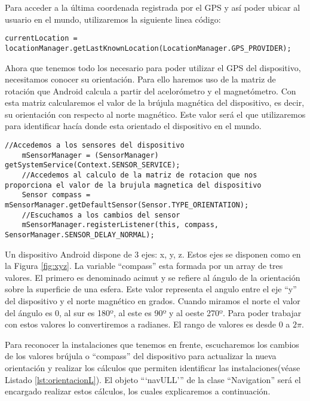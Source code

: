 Para acceder a la última coordenada registrada por el GPS y así poder ubicar al usuario en el mundo, utilizaremos la siguiente linea código:

\begin{lstlisting}[caption={Código para acceder a la última ubicación registrada del GPS.}, label={lst:ubicacionL}]
    currentLocation = locationManager.getLastKnownLocation(LocationManager.GPS_PROVIDER);
\end{lstlisting}


Ahora que tenemos todo los necesario para poder utilizar el GPS del dispositivo, necesitamos conocer su orientación. Para ello haremos uso de la matriz de rotación que Android calcula a partir del acelorómetro y el magnetómetro. Con esta matriz calcularemos el valor de la brújula magnética del dispositivo, es decir, su orientación con respecto al norte magnético. Este valor será el que utilizaremos para identificar hacía donde esta orientado el dispositivo en el mundo.


\begin{lstlisting}[caption={Código para acceder a la última ubicación registrada del GPS.}, label={lst:ubicacionL}]
    //Accedemos a los sensores del dispositivo
    mSensorManager = (SensorManager) getSystemService(Context.SENSOR_SERVICE); 
    //Accedemos al calculo de la matriz de rotacion que nos proporciona el valor de la brujula magnetica del dispositivo
    Sensor compass = mSensorManager.getDefaultSensor(Sensor.TYPE_ORIENTATION);
    //Escuchamos a los cambios del sensor
    mSensorManager.registerListener(this, compass, SensorManager.SENSOR_DELAY_NORMAL);    
\end{lstlisting}
 
Un dispositivo Android dispone de 3 ejes: x, y, z. Estos ejes se disponen como en la Figura \ref{fig:xyz}. La variable ``compass'' esta formada por un array de tres valores. El primero es denominado acimut y se refiere al ángulo de la orientación sobre la superficie de una esfera. Este valor representa el angulo entre el eje ``y'' del dispositivo y el norte magnético en grados. Cuando miramos el norte el valor del ángulo es 0, al sur es 180º, al este es 90º y al oeste 270º. Para poder trabajar con estos valores lo convertiremos a radianes.  El rango de valores es desde $0$ a $2\pi$.

Para reconocer la instalaciones que tenemos en frente, escucharemos los cambios de los valores brújula o ``compass'' del dispositivo para actualizar la nueva orientación y realizar los cálculos que permiten identificar las instalaciones(véase Listado \ref{lst:orientacionL}). El objeto ```navULL''' de la clase ``Navigation'' será el encargado realizar estos cálculos, los cuales explicaremos a continuación.




